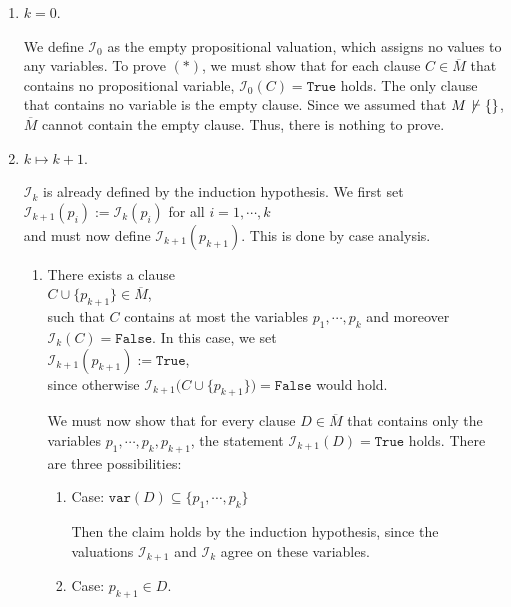 \begin{enumerate}
\item[I.A.:] $k=0$.
 
  We define $\mathcal{I}_0$ as the empty propositional valuation, which assigns no
  values to any variables. To prove $(*)$, we must show that for each clause $C \in \overline{M}$ that contains
  no propositional variable, $\mathcal{I}_0(C) = \mathtt{True}$ holds. The only clause that contains
  no variable is the empty clause. Since we assumed that $M \not\,\vdash \{\}$,
  $\overline{M}$ cannot contain the empty clause. Thus, there is nothing to prove.
\item[I.S.:] $k \mapsto k+1$.

  $\mathcal{I}_k$ is already defined by the induction hypothesis. We first set
  \\[0.2cm]
  \hspace*{1.3cm}
  $\mathcal{I}_{k+1}(p_i) := \mathcal{I}_k(p_i)$ \quad for all $i=1,\cdots,k$
  \\[0.2cm]
  and must now define $\mathcal{I}_{k+1}(p_{k+1})$. This is done by case analysis.
  \begin{enumerate}
  \item There exists a clause
    \\[0.2cm]
    \hspace*{1.3cm}
    $C \cup \{p_{k+1}\} \in \overline{M}$,
    \\[0.2cm]
    such that $C$ contains at most the variables $p_1,\cdots,p_k$ and moreover $\mathcal{I}_k(C) = \mathtt{False}$.
    In this case, we set
    \\[0.2cm]
    \hspace*{1.3cm}
    $\mathcal{I}_{k+1}(p_{k+1}) := \mathtt{True}$,
    \\[0.2cm]    
    since otherwise $\mathcal{I}_{k+1}\bigl(C \cup \{p_{k+1}\}\bigr) = \mathtt{False}$ would hold. 

    We must now show that for every clause $D \in \overline{M}$ that contains only the variables \linebreak
    $p_1,\cdots,p_k,p_{k+1}$, the statement $\mathcal{I}_{k+1}(D) = \mathtt{True}$ holds. There are three
    possibilities:
    \begin{enumerate}[1.]
    \item Case: $\mathtt{var}(D) \subseteq \{p_1,\cdots,p_k\}$

          Then the claim holds by the induction hypothesis, since the valuations
          $\mathcal{I}_{k+1}$ and $\mathcal{I}_k$ agree on these variables.
    \item Case: $p_{k+1} \in D$.
          

\end{enumerate}
\end{enumerate}
\end{enumerate}
